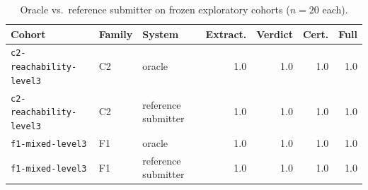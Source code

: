 \begin{table}[t]
\centering
\caption{Oracle vs.\ reference submitter on frozen exploratory cohorts ($n=20$ each).}
\label{tab:reference-submitter-summary}
\begin{tabular}{lllrrrr}
\toprule
Cohort & Family & System & Extract. & Verdict & Cert. & Full \\
\midrule
\texttt{c2-reachability-level3} & C2 & oracle & 1.0 & 1.0 & 1.0 & 1.0 \\
\texttt{c2-reachability-level3} & C2 & reference submitter & 1.0 & 1.0 & 1.0 & 1.0 \\
\texttt{f1-mixed-level3} & F1 & oracle & 1.0 & 1.0 & 1.0 & 1.0 \\
\texttt{f1-mixed-level3} & F1 & reference submitter & 1.0 & 1.0 & 1.0 & 1.0 \\
\bottomrule
\end{tabular}
\end{table}
